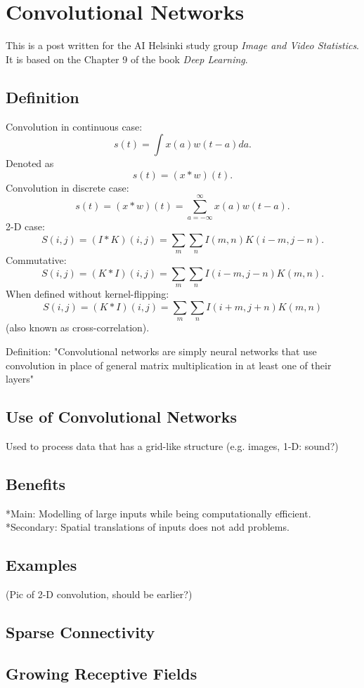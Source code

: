 \documentclass[]{article}
\begin{document}
\section{Convolutional Networks}
This is a post written for the AI Helsinki study group \emph{Image and Video Statistics}.
It is based on the Chapter 9 of the book \emph{Deep Learning}.


\subsection{Definition}
Convolution in continuous case:
\[
s(t) = \int x(a)w(t - a)da.
\]
Denoted as
\[
s(t) = (x * w)(t).
\]
Convolution in discrete case:
\[
s(t) = (x * w)(t) = \sum_{a = -\infty}^{\infty} x(a)w(t - a).
\]
2-D case:
\[
S(i, j) = (I * K)(i, j) = \sum_m \sum_n I(m , n) K(i - m, j - n).
\]
Commutative:
\[
S(i, j) = (K * I)(i, j) = \sum_m \sum_n I(i - m , j - n) K(m, n).
\]
When defined without kernel-flipping:
\[
S(i, j) = (K * I)(i, j) = \sum_m \sum_n I(i + m , j + n) K(m, n)
\]
(also known as cross-correlation).

Definition: "Convolutional networks are simply neural networks that use
convolution in place of general matrix multiplication in at least one of their
layers"
\subsection{Use of Convolutional Networks}
Used to process data that has a grid-like structure (e.g. images, 1-D: sound?)

\subsection{Benefits}
*Main: Modelling of large inputs while being computationally efficient.\\
*Secondary: Spatial translations of inputs does not add problems.

\subsection{Examples}
(Pic of 2-D convolution, should be earlier?)

\subsection{Sparse Connectivity}

\subsection{Growing Receptive Fields}
\end{document}
